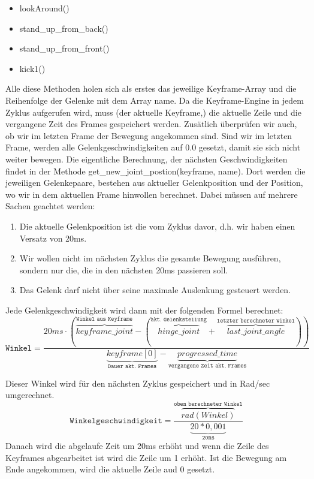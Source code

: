 \begin{itemize}
\item  lookAround()
\item  stand\_up\_from\_back()
\item  stand\_up\_from\_front()
\item  kick1()
\end{itemize}
Alle diese Methoden holen sich als erstes das jeweilige 
Keyframe-Array und die Reihenfolge der Gelenke mit dem Array name. Da 
die Keyframe-Engine in jedem Zyklus aufgerufen wird, muss (der aktuelle 
Keyframe,) die aktuelle Zeile und die vergangene Zeit des Frames 
gespeichert werden. Zusätlich überprüfen wir auch, ob wir im letzten 
Frame der Bewegung angekommen sind. Sind wir im letzten Frame, werden 
alle Gelenkgeschwindigkeiten auf 0.0 gesetzt, damit sie sich nicht 
weiter bewegen.
Die eigentliche Berechnung, der nächsten Geschwindigkeiten findet
 in der Methode get\_new\_joint\_postion(keyframe, name). Dort werden die 
jeweiligen Gelenkepaare, bestehen aus aktueller Gelenkposition und der 
Position, wo wir in dem aktuellen Frame hinwollen berechnet. Dabei 
müssen auf mehrere Sachen geachtet werden:

\begin{enumerate}
\item  Die aktuelle Gelenkposition ist die vom Zyklus davor, d.h. wir haben einen Versatz von 20ms.
\item  Wir wollen nicht im nächsten Zyklus die gesamte Bewegung ausführen, sondern nur die, die in den nächsten 20ms passieren soll.
\item  Das Gelenk darf nicht über seine maximale Auslenkung gesteuert werden.
\end{enumerate}
Jede Gelenkgeschwindigkeit wird dann mit der folgenden Formel berechnet:
\begin{equation}
\texttt{Winkel} = \frac{20ms \cdot (\overbrace{keyframe\_ joint}^{\texttt{Winkel aus Keyframe}} - (\overbrace{hinge\_ joint}^{\texttt{akt. Gelenkstellung}} + \overbrace{last\_ joint\_ angle}^{\texttt{letzter berechneter Winkel}}))}{\underbrace{keyframe[0]}_{\texttt{Dauer akt. Frames}} - \underbrace{progressed\_ time}_{\texttt{vergangene Zeit akt. Frames}}}
\end{equation}

Dieser Winkel wird für den nächsten Zyklus gespeichert und in Rad/sec umgerechnet.
\begin{equation}
\texttt{Winkelgeschwindigkeit} = \frac{\overbrace{rad(Winkel)}^{\texttt{oben berechneter Winkel}}}{\underbrace{20 * 0,001}_{\texttt{20ms}}}
\end{equation}
Danach wird die abgelaufe Zeit um 20ms erhöht und wenn die Zeile 
des Keyframes abgearbeitet ist wird die Zeile um 1 erhöht. Ist die 
Bewegung am Ende angekommen, wird die aktuelle Zeile aud 0 gesetzt.

